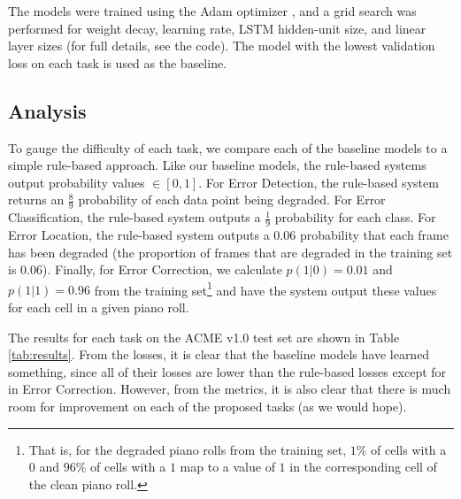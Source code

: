 \documentclass{article}
\begin{document}
The models were trained using the Adam optimizer \cite{adam}, and a grid search was performed for weight decay, learning rate, LSTM hidden-unit size, and linear layer sizes (for full details, see the code). The model with the lowest validation loss on each task is used as the baseline.


\subsection{Analysis}
To gauge the difficulty of each task, we compare each of the baseline models to a simple rule-based approach. Like our baseline models, the rule-based systems output probability values $\in [0, 1]$. For Error Detection, the rule-based system returns an $\frac{8}{9}$ probability of each data point being degraded. For Error Classification, the rule-based system outputs a $\frac{1}{9}$ probability for each class. For Error Location, the rule-based system outputs a $0.06$ probability that each frame has been degraded (the proportion of frames that are degraded in the training set is $0.06$). Finally, for Error Correction, we calculate $p(1|0)=0.01$ and $p(1|1)=0.96$ from the training set\footnote{That is, for the degraded piano rolls from the training set, $1\%$ of cells with a $0$ and $96\%$ of cells with a $1$ map to a value of $1$ in the corresponding cell of the clean piano roll.} and have the system output these values for each cell in a given piano roll.

The results for each task on the ACME v1.0 test set are shown in Table \ref{tab:results}. From the losses, it is clear that the baseline models have learned something, since all of their losses are lower than the rule-based losses except for in Error Correction. However, from the metrics, it is also clear that there is much room for improvement on each of the proposed tasks (as we would hope).
\end{document}
